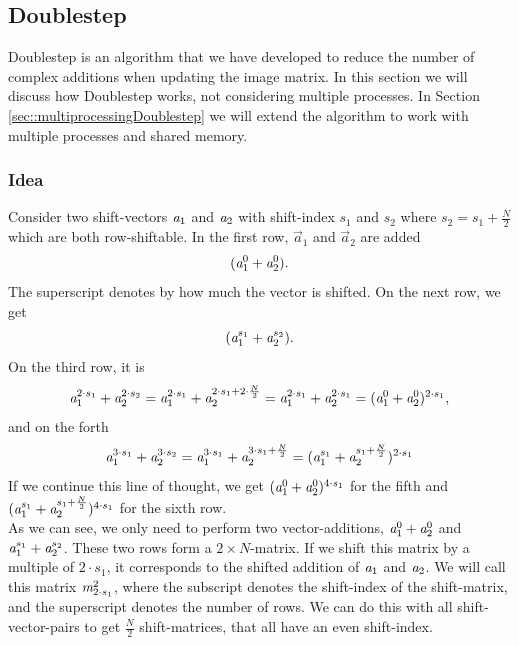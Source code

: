 \documentclass[12pt]{article}
\begin{document}
\subsection{Doublestep}
\label{sec::DB}
Doublestep is an algorithm that we have developed to reduce the number of complex additions when updating the image matrix. In this section we will discuss how Doublestep works, not considering multiple processes. In Section \ref{sec::multiprocessingDoublestep} we will extend the algorithm to work with multiple processes and shared memory.

\subsubsection{Idea}
\label{sec::idea}

Consider two shift-vectors $\emph{a}_1$ and $\emph{a}_2$ with shift-index $s_1$ and $s_2$ where $s_2 = s_1+\frac{N}{2}$ which are both row-shiftable. In the first row, $\vec{a}_1$ and $\vec{a}_2$ are added 
\[
(\emph{a}_1^{0}+\emph{a}_2^{0}).
\] The superscript denotes by how much the vector is shifted. On the next row, we get 
\[
(\emph{a}_1^{s_1}+\emph{a}_2^{s_2}).
\]
 On the third row, it is 
\[
 \emph{a}_1^{2\cdot s_1}+\emph{a}_2^{2\cdot s_2} = \emph{a}_1^{2\cdot s_1}+\emph{a}_2^{2\cdot s_1+2\cdot \frac{N}{2}} = \emph{a}_1^{2\cdot s_1}+\emph{a}_2^{2\cdot s_1} = (\emph{a}_1^{0}+\emph{a}_2^{0})^{2\cdot s_1},
\]
  and on the forth
\[
  \emph{a}_1^{3\cdot s_1}+\emph{a}_2^{3\cdot s_2} = \emph{a}_1^{3\cdot s_1}+\emph{a}_2^{3\cdot s_1+\frac{N}{2}} = (\emph{a}_1^{s_1}+\emph{a}_2^{s_1 +\frac{N}{2}})^{2\cdot s_1}
\]
If we continue this line of thought, we get $(\emph{a}_1^{0}+\emph{a}_2^{0})^{4\cdot s_1}$ for the fifth and $(\emph{a}_1^{s_1}+\emph{a}_2^{s_1 +\frac{N}{2}})^{4\cdot s_1}$ for the sixth row.  \\

As we can see, we only need to perform two vector-additions, $\emph{a}_1^{0}+\emph{a}_2^{0}$ and $\emph{a}_1^{s_1}+\emph{a}_2^{s_2}$. These two rows form a $2\times N$-matrix. If we shift this matrix by a multiple of $2\cdot s_1$, it corresponds to the shifted addition of $\emph{a}_1$ and $\emph{a}_2$. We will call this matrix $\emph{m}_{2\cdot s_1}^2$, where the subscript denotes the shift-index of the shift-matrix, and the superscript denotes the number of rows. We can do this with all shift-vector-pairs to get $\frac{N}{2}$ shift-matrices, that all have an even shift-index.\\
\end{document}
